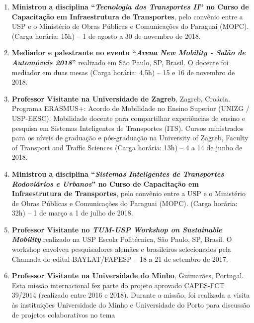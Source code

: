 \documentclass[
  brazilian,
  11pt,
  a4paper,
]{article}
\begin{document}
\begin{enumerate}
  Eduard Ivanjko, Universidade de Zagreb, Zagreb, Croácia. Programa
  ERASMUS+: Acordo de Mobilidade no Ensino Superior (UNIZG / USP-EESC).
  Mobilidade docente para compartilhar experiências de ensino e pesquisa
  em Sistemas Inteligentes de Transportes (ITS). O professor visitante
  realizou palestras na USP-EESC e na USP-Politécnica, em São Paulo
  (Carga horária: 8h) -- 2 a 8 de abril de 2019.
\item
  \textbf{Ministrou a disciplina ``\emph{Tecnologia dos Transportes
  II}'' no Curso de Capacitação em Infraestrutura de Transportes}, pelo
  convênio entre a USP e o Ministério de Obras Públicas e Comunicações
  do Paraguai (MOPC). (Carga horária: 15h) -- 1 de agosto a 30 de
  novembro de 2018.
\item
  \textbf{Mediador e palestrante no evento ``\emph{Arena New Mobility -
  Salão de Automóveis 2018}''} realizado em São Paulo, SP, Brasil. O
  docente foi mediador em duas mesas (Carga horária: 4,5h) -- 15 e 16 de
  novembro de 2018.
\item
  \textbf{Professor Visitante na Universidade de Zagreb}, Zagreb,
  Croácia. Programa ERASMUS+: Acordo de Mobilidade no Ensino Superior
  (UNIZG / USP-EESC). Mobilidade docente para compartilhar experiências
  de ensino e pesquisa em Sistemas Inteligentes de Transportes (ITS).
  Cursos ministrados para os níveis de graduação e pós-graduação na
  University of Zagreb, Faculty of Transport and Traffic Sciences (Carga
  horária: 13h) -- 4 a 14 de junho de 2018.
\item
  \textbf{Ministrou a disciplina ``\emph{Sistemas Inteligentes de
  Transportes Rodoviários e Urbanos}'' no Curso de Capacitação em
  Infraestrutura de Transportes}, pelo convênio entre a USP e o
  Ministério de Obras Públicas e Comunicações do Paraguai (MOPC). (Carga
  horária: 32h) -- 1 de março a 1 de julho de 2018.
\item
  \textbf{Professor Visitante no \emph{TUM-USP Workshop on Sustainable
  Mobility}} realizado na USP Escola Politécnica, São Paulo, SP, Brasil.
  O workshop envolveu pesquisadores alemães e brasileiros selecionados
  pela Chamada do edital BAYLAT/FAPESP -- 18 a 21 de setembro de 2017.
\item
  \textbf{Professor Visitante na Universidade do Minho}, Guimarães,
  Portugal. Esta missão internacional fez parte do projeto aprovado
  CAPES-FCT 39/2014 (realizado entre 2016 e 2018). Durante a missão, foi
  realizada a visita às instituições Universidade do Minho e
  Universidade do Porto para discussão de projetos colaborativos no tema

\end{enumerate}
\end{document}
